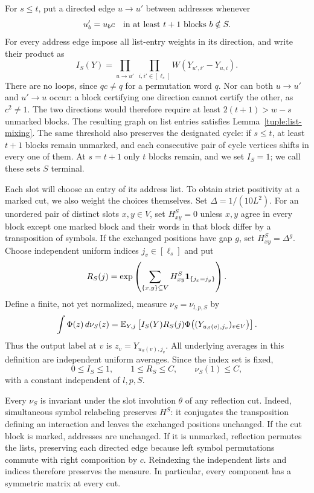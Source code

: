 For $s\le t$, put a directed edge $u\to u'$ between addresses whenever
\[
 u'_b=u_bc
 \quad\hbox{in at least $t+1$ blocks }b\notin S.
\]
For every address edge impose all list-entry weights in its direction,
and write their product as
\[
 I_S(Y)=
 \prod_{u\to u'}\ \prod_{i,i'\in[\ell_s]}
        W(Y_{u',i'}-Y_{u,i}).
\]
There are no loops, since $qc\ne q$ for a permutation word $q$.
Nor can both $u\to u'$ and $u'\to u$ occur: a block certifying one
direction cannot certify the other, as $c^2\ne1$.  The two directions
would therefore require at least $2(t+1)>w-s$ unmarked blocks.
The resulting graph on list entries satisfies
Lemma~\ref{tuple:list-mixing}.  The same threshold also preserves the
designated cycle: if $s\le t$, at least $t+1$ blocks remain unmarked,
and each consecutive pair of cycle vertices shifts in every one of
them.  At $s=t+1$ only $t$ blocks remain, and we set $I_S=1$;
we call these sets $S$ terminal.

Each slot will choose an entry of its address list.  To obtain strict
positivity at a marked cut, we also weight the choices themselves.
Set $\Delta=1/(10L^2)$.  For an unordered pair of distinct slots
$x,y\in V$, set $H^S_{xy}=0$ unless $x,y$ agree in every block except
one marked block and their words in that block differ by a
transposition of symbols.  If the exchanged positions have gap $g$,
set $H^S_{xy}=\Delta^g$.  Choose independent uniform indices
$j_v\in[\ell_s]$ and put
\[
 R_S(j)=\exp\left(\sum_{\{x,y\}\subseteq V}
                         H^S_{xy}\mathbf 1_{\{j_x=j_y\}}\right).
\]
Define a finite, not yet normalized, measure $\nu_S=\nu_{l,p,S}$ by
\[
 \int \Phi(z)\,d\nu_S(z)
   =\mathbb E_{Y,j}\left[
       I_S(Y)R_S(j)
       \Phi\bigl((Y_{u_S(v),j_v})_{v\in V}\bigr)\right].
\]
Thus the output label at $v$ is $z_v=Y_{u_S(v),j_v}$.  All underlying
averages in this definition are independent uniform averages.
Since the index set is fixed,
\[
 0\le I_S\le1,\qquad 1\le R_S\le C,
 \qquad \nu_S(1)\le C,
\]
with a constant independent of $l,p,S$.

Every $\nu_S$ is invariant under the slot involution $\theta$ of any
reflection cut.  Indeed, simultaneous symbol relabeling preserves
$H^S$: it conjugates the transposition defining an interaction and
leaves the exchanged positions unchanged.  If the cut block is
marked, addresses are unchanged.  If it is unmarked, reflection
permutes the lists, preserving each directed edge because left symbol
permutations commute with right composition by $c$.  Reindexing the
independent lists and indices therefore preserves the measure.  In
particular, every component has a symmetric matrix at every cut.


